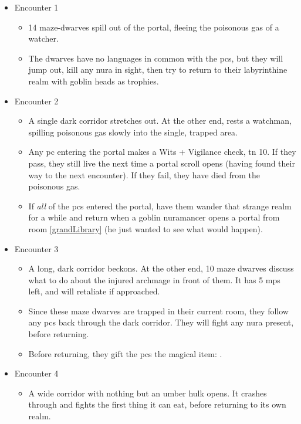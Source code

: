 \begin{multicols}{2}
\begin{itemize}
  \item{Encounter 1}
  \begin{itemize}
    \item{14 maze-dwarves spill out of the portal, fleeing the poisonous gas of a watcher.}
    \item{The dwarves have no languages in common with the \glspl{pc}, but they will jump out, kill any nura in sight, then try to return to their labyrinthine realm with goblin heads as trophies.}
  \end{itemize}
  \item{Encounter 2}
  \begin{itemize}
    \item{A single dark corridor stretches out.  At the other end, rests a watchman, spilling poisonous gas slowly into the single, trapped area.}
    \item
    Any \gls{pc} entering the portal makes a Wits + Vigilance check, \gls{tn} 10. If they pass, they still live the next time a portal scroll opens (having found their way to the next encounter). If they fail, they have died from the poisonous gas.
    \item
    If \emph{all} of the \glspl{pc} entered the portal, have them wander that strange realm for a while and return when a goblin nuramancer opens a portal from room \ref{grandLibrary}\iftoggle{oneshot}{}{ of the lower warren} (he just wanted to see what would happen).
  \end{itemize}
  \item{Encounter 3}
  \begin{itemize}
    \item{A long, dark corridor beckons. At the other end, 10 maze dwarves discuss what to do about the injured archmage in front of them. It has 5 \glspl{mp} left, and will retaliate if approached.}
    \item{Since these maze dwarves are trapped in their current room, they follow any \glspl{pc} back through the dark corridor.  They will fight any nura present, before returning.}
    \item
    Before returning, they gift the \glspl{pc} the magical item: \lootMagic.
  \end{itemize}
  \item{Encounter 4}
  \begin{itemize}
    \item{A wide corridor with nothing but an umber hulk opens. It crashes through and fights the first thing it can eat, before returning to its own realm.}
  \end{itemize}
\end{itemize}

\end{multicols}

